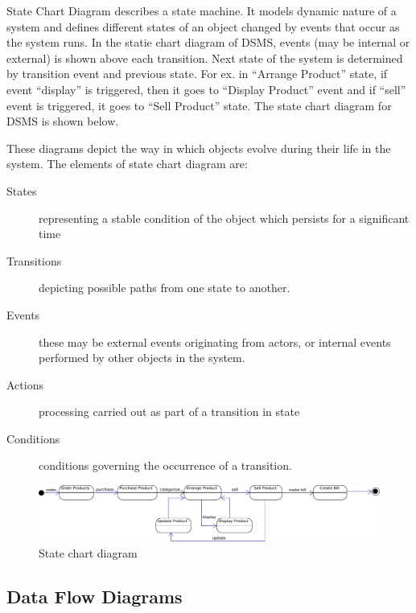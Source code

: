 State Chart Diagram describes a state machine. It models dynamic nature of a
system and defines different states of an object changed by events that occur
as the system runs. In the statie chart diagram of DSMS, events (may be
internal or external) is shown above each transition. Next state of the system
is determined by transition event and previous state. For ex. in ``Arrange
Product'' state, if event ``display'' is triggered, then it goes to ``Display
Product'' event and if ``sell'' event is triggered, it goes to ``Sell Product''
state. The state chart diagram for DSMS is shown below.

These diagrams depict the way in which objects evolve during their life in the
system. The elements of state chart diagram are:
\begin{description}
  \item[States] representing a stable condition of the object which persists
    for a significant time
  \item[Transitions] depicting possible paths from one state to another.
  \item[Events] these may be external events originating from actors, or
    internal events performed by other objects in the system.
  \item[Actions] processing carried out as part of a transition in state
  \item[Conditions] conditions governing the occurrence of a transition.
\end{description}

\begin{figure}[h]\centering
  \includegraphics[width=\textwidth+1cm]{fig/state-chart}
  \caption{State chart diagram}\label{fig:state-chart}
\end{figure}


\subsection{Data Flow Diagrams}

